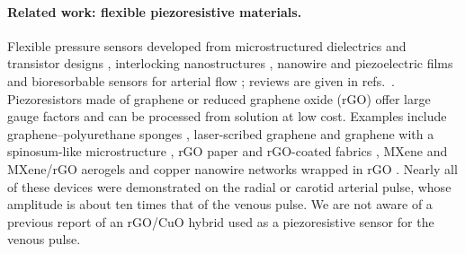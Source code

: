\documentclass[11pt]{article}
\begin{document}
\paragraph{Related work: flexible piezoresistive materials.}
Flexible pressure sensors developed from microstructured dielectrics and transistor designs \cite{schwartz2013flexible,wang2014silk}, interlocking nanostructures \cite{pang2012flexible}, nanowire and piezoelectric films \cite{gong2014wearable,dagdeviren2014conformable,park2017self} and bioresorbable sensors for arterial flow \cite{boutry2019biodegradable}; reviews are given in refs.~\cite{chortos2016pursuing,ray2019bio,meng2022wearable}. Piezoresistors made of graphene or reduced graphene oxide (rGO) offer large gauge factors and can be processed from solution at low cost. Examples include graphene--polyurethane sponges \cite{yao2013flexible}, laser-scribed graphene and graphene with a spinosum-like microstructure \cite{tian2015graphene,pang2018epidermis}, rGO paper and rGO-coated fabrics \cite{tao2017graphene,li2019wearable}, MXene and MXene/rGO aerogels \cite{ma2017highly,ma2018synergistical} and copper nanowire networks wrapped in rGO \cite{zhu2022epidermis}. Nearly all of these devices were demonstrated on the radial or carotid arterial pulse, whose amplitude is about ten times that of the venous pulse. We are not aware of a previous report of an rGO/CuO hybrid used as a piezoresistive sensor for the venous pulse.
\end{document}
